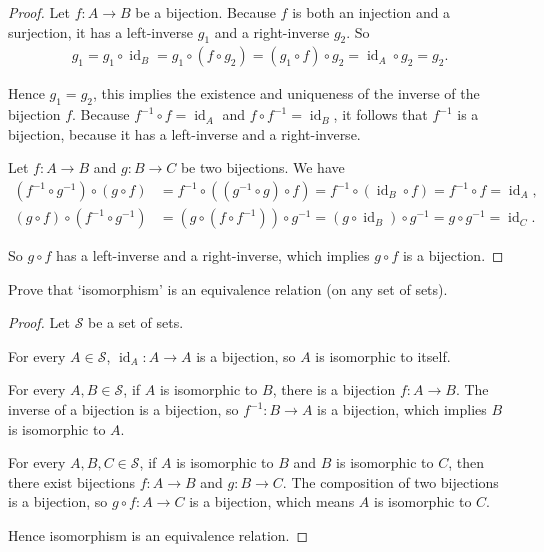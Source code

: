 \begin{proof}
	Let $f: A\to B$ be a bijection. Because $f$ is both an injection and a surjection, it has a left-inverse $g_{1}$ and a right-inverse $g_{2}$. So
	\begin{align*}
		g_{1} = g_{1}\circ \operatorname{id}_{B} = g_{1}\circ (f\circ g_{2}) = (g_{1}\circ f)\circ g_{2} = \operatorname{id}_{A}\circ g_{2} = g_{2}.
	\end{align*}

	Hence $g_{1} = g_{2}$, this implies the existence and uniqueness of the inverse of the bijection $f$. Because $f^{-1}\circ f = \operatorname{id}_{A}$ and $f\circ f^{-1} = \operatorname{id}_{B}$, it follows that $f^{-1}$ is a bijection, because it has a left-inverse and a right-inverse.

	\bigskip
	Let $f: A\to B$ and $g: B\to C$ be two bijections. We have
	\begin{align*}
		(f^{-1}\circ g^{-1})\circ (g\circ f)  & = f^{-1}\circ ((g^{-1}\circ g)\circ f) = f^{-1}\circ (\operatorname{id}_{B}\circ f) = f^{-1}\circ f = \operatorname{id}_{A}, \\
		(g\circ f) \circ (f^{-1}\circ g^{-1}) & = (g\circ (f\circ f^{-1}))\circ g^{-1} = (g\circ\operatorname{id}_{B})\circ g^{-1} = g\circ g^{-1} = \operatorname{id}_{C}.
	\end{align*}

	So $g\circ f$ has a left-inverse and a right-inverse, which implies $g\circ f$ is a bijection.
\end{proof}

\begin{exercise}{2.4}
	Prove that `isomorphism' is an equivalence relation (on any set of sets).
\end{exercise}

\begin{proof}
	Let $\mathscr{S}$ be a set of sets.

	For every $A\in\mathscr{S}$, $\operatorname{id}_{A}: A\to A$ is a bijection, so $A$ is isomorphic to itself.

	For every $A, B\in\mathscr{S}$, if $A$ is isomorphic to $B$, there is a bijection $f: A\to B$. The inverse of a bijection is a bijection, so $f^{-1}: B\to A$ is a bijection, which implies $B$ is isomorphic to $A$.

	For every $A, B, C\in\mathscr{S}$, if $A$ is isomorphic to $B$ and $B$ is isomorphic to $C$, then there exist bijections $f: A\to B$ and $g: B\to C$. The composition of two bijections is a bijection, so $g\circ f: A\to C$ is a bijection, which means $A$ is isomorphic to $C$.

	Hence isomorphism is an equivalence relation.
\end{proof}

